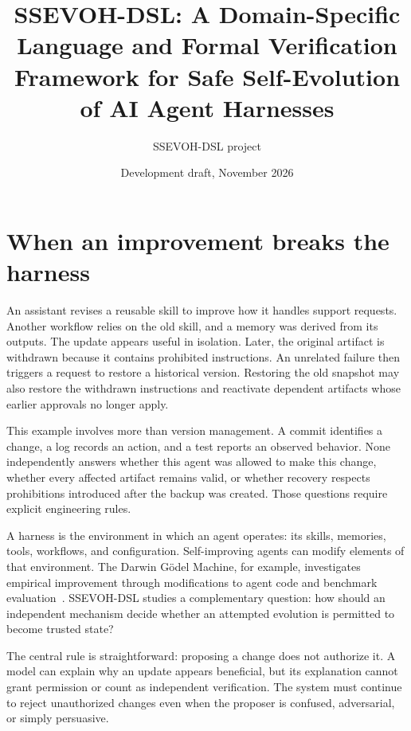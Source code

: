 \IfFileExists{IEEEcsmag.cls}{\publishertrue\documentclass{IEEEcsmag}}{\publisherfalse\documentclass[11pt]{article}}
\title{SSEVOH-DSL: A Domain-Specific Language and Formal Verification Framework for Safe Self-Evolution of AI Agent Harnesses}
\author{SSEVOH-DSL project}
\date{Development draft, November 2026}
\begin{document}
\ifpublisher{}\fi
\ifpublisher\else\maketitle\fi
\begin{abstract}
\end{abstract}
\ifpublisher\maketitle\fi

\section{When an improvement breaks the harness}
An assistant revises a reusable skill to improve how it handles support requests. Another workflow relies on the old skill, and a memory was derived from its outputs. The update appears useful in isolation. Later, the original artifact is withdrawn because it contains prohibited instructions. An unrelated failure then triggers a request to restore a historical version. Restoring the old snapshot may also restore the withdrawn instructions and reactivate dependent artifacts whose earlier approvals no longer apply.

This example involves more than version management. A commit identifies a change, a log records an action, and a test reports an observed behavior. None independently answers whether this agent was allowed to make this change, whether every affected artifact remains valid, or whether recovery respects prohibitions introduced after the backup was created. Those questions require explicit engineering rules.

A harness is the environment in which an agent operates: its skills, memories, tools, workflows, and configuration. Self-improving agents can modify elements of that environment. The Darwin G\"odel Machine, for example, investigates empirical improvement through modifications to agent code and benchmark evaluation~\cite{zhang2025}. SSEVOH-DSL studies a complementary question: how should an independent mechanism decide whether an attempted evolution is permitted to become trusted state?

The central rule is straightforward: proposing a change does not authorize it. A model can explain why an update appears beneficial, but its explanation cannot grant permission or count as independent verification. The system must continue to reject unauthorized changes even when the proposer is confused, adversarial, or simply persuasive.
\end{document}

